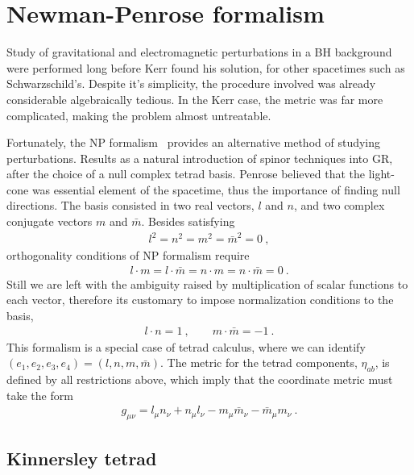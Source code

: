 \section{Newman-Penrose formalism}

Study of gravitational and electromagnetic perturbations in a BH background were performed long before Kerr found his solution, for other spacetimes such as Schwarzschild's. Despite it's simplicity, the procedure involved was already considerable algebraically tedious. In the Kerr case, the metric was far more complicated, making the problem almost untreatable.

Fortunately, the NP formalism~\cite{Newman1962} provides an alternative method of studying perturbations.
Results as a natural introduction of spinor techniques into GR, after the choice of a null complex tetrad basis. Penrose believed that the light-cone was essential element of the spacetime, thus the importance of finding null directions. The basis consisted in two real vectors, $l$ and $n$, and two complex conjugate vectors $m$ and $\bar{m}$. Besides satisfying
\begin{align}
    l^2 = n^2 = m^2 = \bar{m}^2 = 0 ~,
\end{align}
orthogonality conditions of NP formalism require
\begin{align}
    l \cdot m = l \cdot \bar{m} = n \cdot m = n \cdot \bar{m} = 0 ~.
\end{align}
Still we are left with the ambiguity raised by multiplication of scalar functions to each vector, therefore its customary to impose normalization conditions to the basis,
\begin{align}
    l \cdot n = 1 ~, \qquad m \cdot \bar{m} = -1 ~.
\end{align}
This formalism is a special case of tetrad calculus, where we can identify $(e_1,e_2,e_3,e_4)=(l,n,m,\bar{m})$. The metric for the tetrad components, $\eta_{ab}$, is defined by all restrictions above, which imply that the coordinate metric must take the form
\begin{align}
    g_{\mu\nu} = l_{\mu} n_{\nu} + n_{\mu} l_{\nu} - m_{\mu} \bar{m}_{\nu} - \bar{m}_{\mu} m_{\nu} ~.
\end{align}

\subsection{Kinnersley tetrad}

